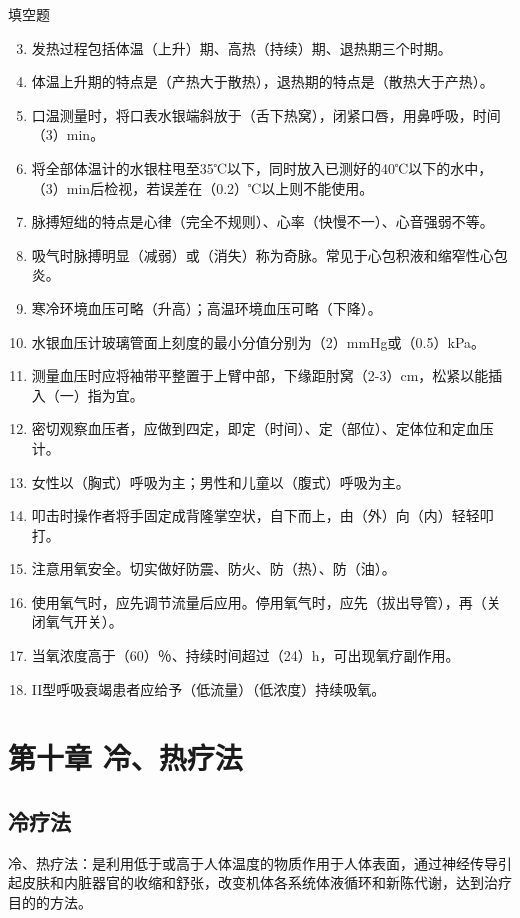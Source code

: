 \documentclass[11pt, a4paper]{ctexart}
\begin{document}
\begin{tipsbox}{填空题}
\begin{enumerate}
    \setcounter{enumi}{2}
    \item 发热过程包括体温（上升）期、高热（持续）期、退热期三个时期。
    \item 体温上升期的特点是（产热大于散热），退热期的特点是（散热大于产热）。
    \item 口温测量时，将口表水银端斜放于（舌下热窝），闭紧口唇，用鼻呼吸，时间（3）min。
    \item 将全部体温计的水银柱甩至35℃以下，同时放入已测好的40℃以下的水中，（3）min后检视，若误差在（0.2）℃以上则不能使用。
    \item 脉搏短绌的特点是心律（完全不规则）、心率（快慢不一）、心音强弱不等。
    \item 吸气时脉搏明显（减弱）或（消失）称为奇脉。常见于心包积液和缩窄性心包炎。
    \item 寒冷环境血压可略（升高）；高温环境血压可略（下降）。
    \item 水银血压计玻璃管面上刻度的最小分值分别为（2）mmHg或（0.5）kPa。
    \item 测量血压时应将袖带平整置于上臂中部，下缘距肘窝（2-3）cm，松紧以能插入（一）指为宜。
    \item 密切观察血压者，应做到四定，即定（时间）、定（部位）、定体位和定血压计。
    \item 女性以（胸式）呼吸为主；男性和儿童以（腹式）呼吸为主。
    \item 叩击时操作者将手固定成背隆掌空状，自下而上，由（外）向（内）轻轻叩打。
    \item 注意用氧安全。切实做好防震、防火、防（热）、防（油）。
    \item 使用氧气时，应先调节流量后应用。停用氧气时，应先（拔出导管），再（关闭氧气开关）。
    \item 当氧浓度高于（60）％、持续时间超过（24）h，可出现氧疗副作用。
    \item II型呼吸衰竭患者应给予（低流量）（低浓度）持续吸氧。
\end{enumerate}
\end{tipsbox}

\section{第十章 冷、热疗法}
\subsection{冷疗法}
冷、热疗法：是利用低于或高于人体温度的物质作用于人体表面，通过神经传导引起皮肤和内脏器官的收缩和舒张，改变机体各系统体液循环和新陈代谢，达到治疗目的的方法。
\end{document}
